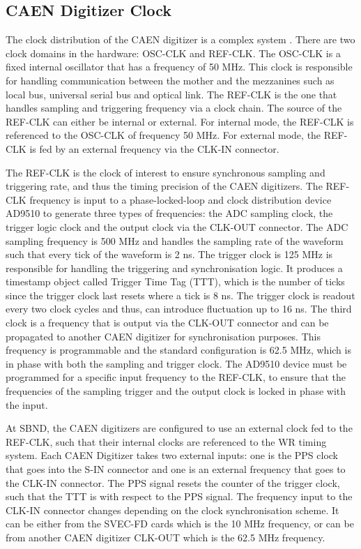 \subsection{CAEN Digitizer Clock}

The clock distribution of the CAEN digitizer is a complex system \cite{}.
There are two clock domains in the hardware: OSC-CLK and REF-CLK.
The OSC-CLK is a fixed internal oscillator that has a frequency of 50 MHz. 
This clock is responsible for handling communication between the mother and the mezzanines such as local bus, universal serial bus and optical link.
The REF-CLK is the one that handles sampling and triggering frequency via a clock chain.
The source of the REF-CLK can either be internal or external.
For internal mode, the REF-CLK is referenced to the OSC-CLK of frequency 50 MHz.
For external mode, the REF-CLK is fed by an external frequency via the CLK-IN connector. 

The REF-CLK is the clock of interest to ensure synchronous sampling and triggering rate, and thus the timing precision of the CAEN digitizers.
The REF-CLK frequency is input to a phase-locked-loop and clock distribution device AD9510 to generate three types of frequencies: the ADC sampling clock, the trigger logic clock and the output clock via the CLK-OUT connector.
The ADC sampling frequency is 500 MHz and handles the sampling rate of the waveform such that every tick of the waveform is 2 ns. 
The trigger clock is 125 MHz is responsible for handling the triggering and synchronisation logic.
It produces a timestamp object called Trigger Time Tag (TTT), which is the number of ticks since the trigger clock last resets where a tick is 8 ns.
The trigger clock is readout every two clock cycles and thus, can introduce fluctuation up to 16 ns.
The third clock is a frequency that is output via the CLK-OUT connector and can be propagated to another CAEN digitizer for synchronisation purposes.
This frequency is programmable and the standard configuration is 62.5 MHz, which is in phase with both the sampling and trigger clock.
The AD9510 device must be programmed for a specific input frequency to the REF-CLK, to ensure that the frequencies of the sampling trigger and the output clock is locked in phase with the input.

At SBND, the CAEN digitizers are configured to use an external clock fed to the REF-CLK, such that their internal clocks are referenced to the WR timing system. 
Each CAEN Digitizer takes two external inputs: one is the PPS clock that goes into the S-IN connector and one is an external frequency that goes to the CLK-IN connector.
The PPS signal resets the counter of the trigger clock, such that the TTT is with respect to the PPS signal.
The frequency input to the CLK-IN connector changes depending on the clock synchronisation scheme. 
It can be either from the SVEC-FD cards which is the 10 MHz frequency, or can be from another CAEN digitizer CLK-OUT which is the 62.5 MHz frequency.

